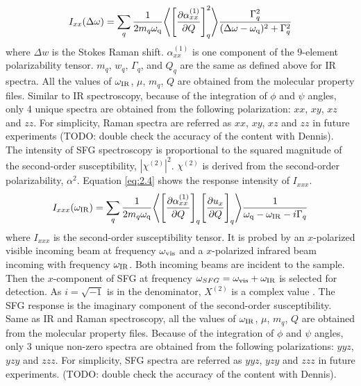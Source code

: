 \begin{equation} \label{eq:2.3}
I_{xx}(\Delta \omega) = \sum_{q} \frac{1}{2 m_{q} \omega_{\rm q}} \Bigg \langle \Bigg\lbrack \frac{\partial \alpha_{xx}^{(1)}}{\partial Q} \Bigg\rbrack_{q} ^2 \Bigg\rangle \frac{\Gamma_q^2}{(\Delta \omega-\omega_{\rm q})^2 + \Gamma_q^2}
\end{equation} 
where $\Delta w$ is the Stokes Raman shift. $\alpha_{xx}^{(1)}$ is one component of the $9$-element polarizability tensor. $m_q$, $w_q$, $\Gamma_q$, and $Q_q$ are the same as defined above for IR spectra. All the values of $\omega_{\rm IR}$, $\mu$, $m_q$, $Q$ are obtained from the molecular property files. Similar to IR spectroscopy, because of the integration of $\phi$ and $\psi$ angles, only 4 unique spectra are obtained from the following polarization: $xx$, $xy$, $xz$ and $zz$. For simplicity, Raman spectra are referred as $xx$, $xy$, $xz$ and $zz$ in future experiments (TODO: double check the accuracy of the content with Dennis). \\

The intensity of SFG spectroscopy is proportional to the squared magnitude of the second-order susceptibility, $\left|\chi^{(2)}\right|^{2}$. $\chi^{(2)}$ is derived from the second-order polarizability, $\alpha^{2}$. Equation \ref{eq:2.4} shows the response intensity of $I_{xxx}$. \\
\begin{equation} \label{eq:2.4}
I_{xxx}(\omega_{\rm IR}) = \sum_{q} \frac{1}{2 m_{q} \omega_{\rm q}} \Bigg \langle \Bigg\lbrack \frac{\partial \alpha_{xx}^{(1)}}{\partial Q} \Bigg\rbrack_{q} \Bigg\lbrack \frac{\partial u_{x}}{\partial Q} \Bigg\rbrack_{q} \Bigg\rangle \frac{1}{\omega_{\rm q}-\omega_{\rm IR}-i\Gamma_q}
\end{equation} 
where $I_{xxx}$ is the second-order susceptibility tensor. It is probed by an $x$-polarized visible incoming beam at frequency $\omega_{\rm vis}$ and a $x$-polarized infrared beam incoming with frequency $\omega_{\rm IR}$. Both incoming beams are incident to the sample. Then the $x$-component of SFG at frequency $\omega_{SFG}=\omega_{\rm vis}+\omega_{\rm IR}$ is selected for detection. As $i=\sqrt{-1}$ is in the denominator, $X^{(2)}$ is a complex value \cite{KuoKaiHung:Thesis:2015}. The SFG response is the imaginary component of the second-order susceptibility. Same as IR and Raman spectroscopy, all the values of $\omega_{\rm IR}$, $\mu$, $m_q$, $Q$ are obtained from the molecular property files. Because of the integration of $\phi$ and $\psi$ angles, only 3 unique non-zero spectra are obtained from the following polarizations: $yyz$, $yzy$ and $zzz$. For simplicity, SFG spectra are referred as $yyz$, $yzy$ and $zzz$ in future experiments.  (TODO: double check the accuracy of the content with Dennis). \\

